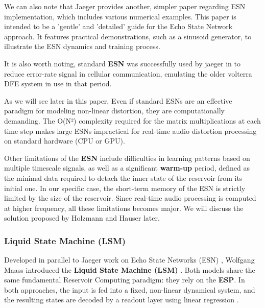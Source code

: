 \vspace{0.5cm}

We can also note that Jaeger provides another, simpler paper regarding ESN implementation, which includes various numerical examples. \cite{jaeger2002tutorial} This paper is intended to be a 'gentle' and 'detailed' guide for the Echo State Network approach. It features practical demonstrations, such as a sinusoid generator, to illustrate the ESN dynamics and training process.

\vspace{0.5cm}

It is also worth noting, standard \textbf{ESN} was successfully used by jaeger in \cite{jaeger2004harnessing} to reduce error-rate signal in cellular communication, emulating the older volterra DFE system in use in that period.

\vspace{0.5cm}

As we will see later in this paper, Even if standard ESNs are an effective paradigm for modeling non-linear distortion, they are computationally demanding. The O(N²) complexity required for the matrix multiplications at each time step makes large ESNs impractical for real-time audio distortion processing on standard hardware (CPU or GPU).

\vspace{0.5cm}

Other limitations of the \textbf{ESN} include difficulties in learning patterns based on multiple timescale signals, as well as a significant \textbf{warm-up} period, defined as the minimal data required to detach the inner state of the reservoir from its initial one.
In our specific case, the short-term memory of the ESN is strictly limited by the size of the reservoir. Since real-time audio processing is computed at higher frequency, all these limitations becomes major. We will discuss the solution proposed by Holzmann and Hauser \cite{holzmann2010echo} later.

\subsubsection{Liquid State Machine (LSM)}

Developed in parallel to Jaeger work on Echo State Networks (ESN) \cite{Jaeger10ESN}, Wolfgang Maass introduced the \textbf{Liquid State Machine (LSM)} \cite{maass2002realtime}. Both models share the same fundamental Reservoir Computing paradigm: they rely on the \textbf{ESP}. In both approaches, the input is fed into a fixed, non-linear dynamical system, and the resulting states are decoded by a readout layer using linear regression \cite{Jaeger10ESN, maass2002realtime}.

